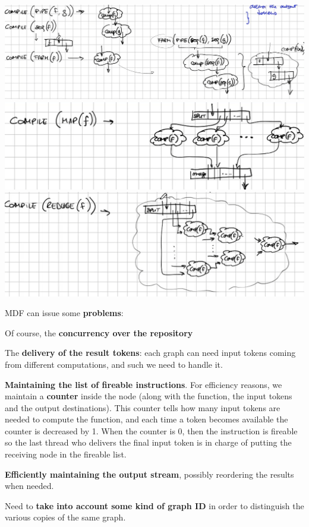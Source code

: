 \documentclass[10pt]{report}
\begin{document}
\begin{center}
	\includegraphics[scale=0.4]{31.png}\\
	\includegraphics[scale=0.5]{32.png}\\
	\includegraphics[scale=0.5]{33.png}
\end{center}
MDF can issue some \textbf{problems}:
\begin{list}{}{}
	\item Of course, the \textbf{concurrency over the repository}
	\item The \textbf{delivery of the result tokens}: each graph can need input tokens coming from different computations, and such we need to handle it.
	\item \textbf{Maintaining the list of fireable instructions}. For efficiency reasons, we maintain a \textbf{counter} inside the node (along with the function, the input tokens and the output destinations). This counter tells how many input tokens are needed to compute the function, and each time a token becomes available the counter is decreased by 1. When the counter is 0, then the instruction is fireable so the last thread who delivers the final input token is in charge of putting the receiving node in the fireable list.
	\item \textbf{Efficiently maintaining the output stream}, possibly reordering the results when needed.
	\item Need to \textbf{take into account some kind of graph ID} in order to distinguish the various copies of the same graph.
\end{list}
\end{document}
